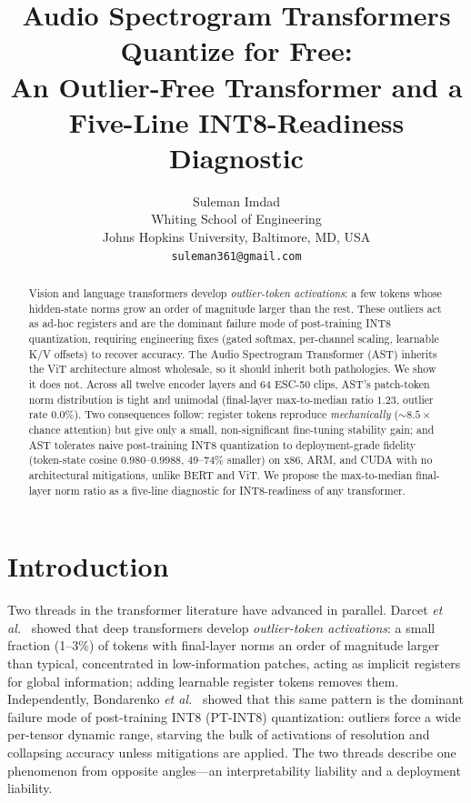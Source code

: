 \documentclass{article}
\title{Audio Spectrogram Transformers Quantize for Free:\\ An Outlier-Free Transformer and a Five-Line INT8-Readiness Diagnostic}
\author{%
  Suleman Imdad \\
  Whiting School of Engineering \\
  Johns Hopkins University, Baltimore, MD, USA \\
  \texttt{suleman361@gmail.com} \\
}
\begin{document}
\maketitle

\begin{abstract}
Vision and language transformers develop \emph{outlier-token activations}: a few tokens whose hidden-state norms grow an order of magnitude larger than the rest. These outliers act as ad-hoc registers and are the dominant failure mode of post-training INT8 quantization, requiring engineering fixes (gated softmax, per-channel scaling, learnable K/V offsets) to recover accuracy. The Audio Spectrogram Transformer (AST) inherits the ViT architecture almost wholesale, so it should inherit both pathologies. We show it does not. Across all twelve encoder layers and 64 ESC-50 clips, AST's patch-token norm distribution is tight and unimodal (final-layer max-to-median ratio $1.23$, outlier rate $0.0\%$). Two consequences follow: register tokens reproduce \emph{mechanically} ($\sim\!8.5\times$ chance attention) but give only a small, non-significant fine-tuning stability gain; and AST tolerates naive post-training INT8 quantization to deployment-grade fidelity (token-state cosine $0.980$--$0.9988$, $49$--$74\%$ smaller) on x86, ARM, and CUDA with no architectural mitigations, unlike BERT and ViT. We propose the max-to-median final-layer norm ratio as a five-line diagnostic for INT8-readiness of any transformer.
\end{abstract}

\section{Introduction}
Two threads in the transformer literature have advanced in parallel. Darcet \emph{et al.}~\cite{darcet2024need} showed that deep transformers develop \emph{outlier-token activations}: a small fraction (1--3\%) of tokens with final-layer norms an order of magnitude larger than typical, concentrated in low-information patches, acting as implicit registers for global information; adding learnable register tokens removes them. Independently, Bondarenko \emph{et al.}~\cite{bondarenko2023quantizable} showed that this same pattern is the dominant failure mode of post-training INT8 (PT-INT8) quantization: outliers force a wide per-tensor dynamic range, starving the bulk of activations of resolution and collapsing accuracy unless mitigations are applied. The two threads describe one phenomenon from opposite angles---an interpretability liability and a deployment liability.
\end{document}
